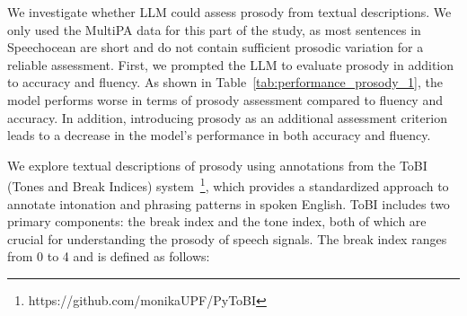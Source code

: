 \documentclass[11pt]{article}
\begin{document}
We investigate whether LLM could assess prosody from textual descriptions. We only used the MultiPA data for this part of the study, as most sentences in Speechocean are short and do not contain sufficient prosodic variation for a reliable assessment. First, we prompted the LLM to evaluate prosody in addition to accuracy and fluency. As shown in Table~\ref{tab:performance_prosody_1}, the model performs worse in terms of prosody assessment compared to fluency and accuracy. In addition, introducing prosody as an additional assessment criterion leads to a decrease in the model's performance in both accuracy and fluency.

\begin{table}[htbp!]
\centering
\renewcommand{\arraystretch}{1.1}
  \caption{LLM performance with and without prosody assessment. \emph{LLM\(_{p}\): all} is \emph{LLM: all} with the introduction of prosody as an additional assessment criterion. Note that the transcript is generated using \textit{turbo} version of Whisper, an optimized version of \textit{large-v3} that provides faster transcription with minimal loss in accuracy. The results indicate that \textit{turbo} performs comparably to \textit{large-v3-en}. (Section~\ref{sec:performance_on_free_speech})}
  \label{tab:performance_prosody_1}
\end{table}

We explore textual descriptions of prosody using annotations from the ToBI (Tones and Break Indices) system~\cite{beckman1994tobi}\footnote{https://github.com/monikaUPF/PyToBI}, which provides a standardized approach to annotate intonation and phrasing patterns in spoken English. ToBI includes two primary components: the break index and the tone index, both of which are crucial for understanding the prosody of speech signals. The break index ranges from 0 to 4 and is defined as follows:
\end{document}
